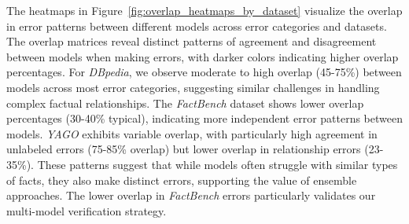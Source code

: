 The heatmaps in Figure~\ref{fig:overlap_heatmaps_by_dataset} visualize the overlap in error patterns between different models across error categories and datasets.
The overlap matrices reveal distinct patterns of agreement and disagreement between models when making errors, with darker colors indicating higher overlap percentages.
For \textit{DBpedia}, we observe moderate to high overlap (45-75\%) between models across most error categories, suggesting similar challenges in handling complex factual relationships.
The \textit{FactBench} dataset shows lower overlap percentages (30-40\% typical), indicating more independent error patterns between models.
\textit{YAGO} exhibits variable overlap, with particularly high agreement in unlabeled errors (75-85\% overlap) but lower overlap in relationship errors (23-35\%).
These patterns suggest that while models often struggle with similar types of facts, they also make distinct errors, supporting the value of ensemble approaches.
The lower overlap in \textit{FactBench} errors particularly validates our multi-model verification strategy.

